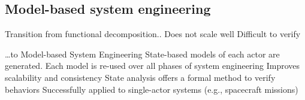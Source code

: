 \subsection*{Model-based system engineering}




Transition from functional decomposition..
Does not scale well
Difficult to verify


…to Model-based System Engineering 
State-based models of each actor are generated.
Each model is re-used over all phases of system engineering
Improves scalability and consistency
State analysis offers a formal method to verify behaviors
Successfully applied to single-actor systems (e.g., spacecraft missions)

